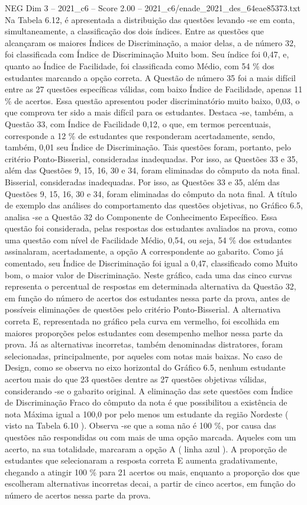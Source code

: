 \begin{textsample}{NEG Dim 3 – 2021\_c6 – Score 2.00 – 2021\_c6/enade\_2021\_des\_64eae85373.txt}
Na Tabela 6.12, é apresentada a distribuição das questões levando -se em conta, simultaneamente, a classificação dos dois índices.
Entre as questões que alcançaram os maiores Índices de Discriminação, a maior delas, a de número 32, foi classificada com Índice de Discriminação Muito bom.
Seu índice foi 0,47, e, quanto ao Índice de Facilidade, foi classificada como Médio, com 54 \% dos estudantes marcando a opção correta.
A Questão de número 35 foi a mais difícil entre as 27 questões específicas válidas, com baixo Índice de Facilidade, apenas 11 \% de acertos.
Essa questão apresentou poder discriminatório muito baixo, 0,03, o que comprova ter sido a mais difícil para os estudantes.
Destaca -se, também, a Questão 33, com Índice de Facilidade 0,12, o que, em termos percentuais, corresponde a 12 \% de estudantes que responderam acertadamente, sendo, também, 0,01 seu Índice de Discriminação.
Tais questões foram, portanto, pelo critério Ponto-Bisserial, consideradas inadequadas.
Por isso, as Questões 33 e 35, além das Questões 9, 15, 16, 30 e 34, foram eliminadas do cômputo da nota final.
Bisserial, consideradas inadequadas.
Por isso, as Questões 33 e 35, além das Questões 9, 15, 16, 30 e 34, foram eliminadas do cômputo da nota final.
A título de exemplo das análises do comportamento das questões objetivas, no Gráfico 6.5, analisa -se a Questão 32 do Componente de Conhecimento Específico.
Essa questão foi considerada, pelas respostas dos estudantes avaliados na prova, como uma questão com nível de Facilidade Médio, 0,54, ou seja, 54 \% dos estudantes assinalaram, acertadamente, a opção A correspondente ao gabarito.
Como já comentado, seu Índice de Discriminação foi igual a 0,47, classificado como Muito bom, o maior valor de Discriminação.
Neste gráfico, cada uma das cinco curvas representa o percentual de respostas em determinada alternativa da Questão 32, em função do número de acertos dos estudantes nessa parte da prova, antes de possíveis eliminações de questões pelo critério Ponto-Bisserial.
A alternativa correta E, representada no gráfico pela curva em vermelho, foi escolhida em maiores proporções pelos estudantes com desempenho melhor nessa parte da prova.
Já as alternativas incorretas, também denominadas distratores, foram selecionadas, principalmente, por aqueles com notas mais baixas.
No caso de Design, como se observa no eixo horizontal do Gráfico 6.5, nenhum estudante acertou mais do que 23 questões dentre as 27 questões objetivas válidas, considerando -se o gabarito original.
A eliminação das sete questões com Índice de Discriminação Fraco do cômputo da nota é que possibilitou a existência de nota Máxima igual a 100,0 por pelo menos um estudante da região Nordeste ( visto na Tabela 6.10 ).
Observa -se que a soma não é 100 \%, por causa das questões não respondidas ou com mais de uma opção marcada.
Aqueles com um acerto, na sua totalidade, marcaram a opção A ( linha azul ).
A proporção de estudantes que selecionaram a resposta correta E aumenta gradativamente, chegando a atingir 100 \% para 21 acertos ou mais, enquanto a proporção dos que escolheram alternativas incorretas decai, a partir de cinco acertos, em função do número de acertos nessa parte da prova.

\end{textsample}
